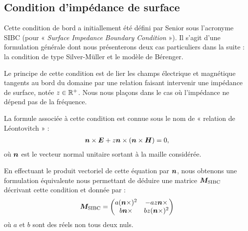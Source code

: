 
\subsection{Condition d'impédance de surface}
\label{ssect:SIBC}


Cette condition de bord a initiallement été défini par Senior \cite{Senior1960} sous l'acronyme SIBC (pour
« \textit{Surface Impedance Boundary Condition} »).
Il s'agit d'une formulation générale dont nous présenterons
deux cas particuliers dans la suite : la condition de type Silver-Müller
et le modèle de Bérenger.

Le principe de cette condition est de lier les champs électrique et magnétique
tangents au bord du domaine par une relation faisant intervenir une
impédance de surface, notée $z \in \mathbb{R}^{+}$.
Nous nous plaçons dans le cas où l’impédance ne dépend pas de la fréquence.

La formule associée à cette condition est connue sous le nom de
« relation de Léontovitch » :
\begin{align}
	\bm{n} \times \bm{E} + z \bm{n} \times (\bm{n} \times \bm{H}) = 0
	\label{eq:leontovitch} ,
\end{align}
où $\bm{n}$ est le vecteur normal unitaire sortant à la maille considérée.

En effectuant le produit vectoriel de cette équation par $\bm{n}$,
nous obtenons une formulation équivalente nous permettant de déduire
une matrice $\bm{M}_{\mathrm{SIBC}}$ décrivant cette condition et donnée par :
\begin{align}
	\bm{M}_{\mathrm{SIBC}} =
	\begin{pmatrix}
		a (\bm{n} \times)^2 & - a z \bm{n} \times \\
		b \bm{n} \times & b z (\bm{n} \times)^2
	\end{pmatrix}
\end{align}
où $a$ et $b$ sont des réels non tous deux nuls.



